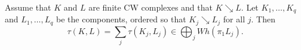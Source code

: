 Assume that $K$ and $L$ are finite CW complexes and that $K \searrow L$. Let $K_1, \ldots, K_q$ and $L_1, \ldots, L_q$ be the components, ordered so that $K_j \searrow L_j$ for all $j$. Then
$$\tau(K, L) = \sum_j \tau(K_j, L_j) \in \bigoplus_j Wh(\pi_1 L_j).$$

